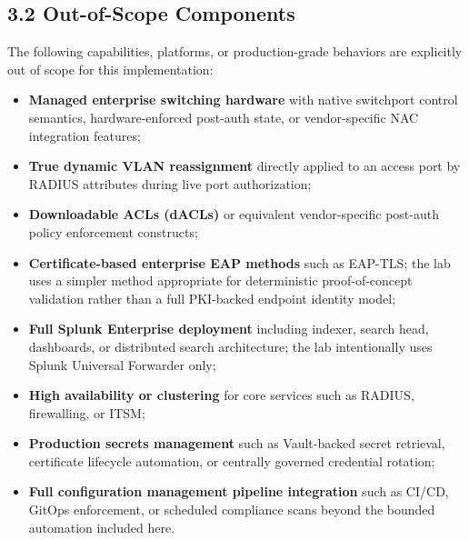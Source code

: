 \documentclass[11pt]{article}
\begin{document}

\subsection{3.2 Out-of-Scope Components}
\label{sec:out-of-scope-components}

The following capabilities, platforms, or production-grade behaviors are explicitly out of scope for this implementation:

\begin{itemize}
    \item \textbf{Managed enterprise switching hardware} with native switchport control semantics, hardware-enforced post-auth state, or vendor-specific NAC integration features;
    \item \textbf{True dynamic VLAN reassignment} directly applied to an access port by RADIUS attributes during live port authorization;
    \item \textbf{Downloadable ACLs (dACLs)} or equivalent vendor-specific post-auth policy enforcement constructs;
    \item \textbf{Certificate-based enterprise EAP methods} such as EAP-TLS; the lab uses a simpler method appropriate for deterministic proof-of-concept validation rather than a full PKI-backed endpoint identity model;
    \item \textbf{Full Splunk Enterprise deployment} including indexer, search head, dashboards, or distributed search architecture; the lab intentionally uses Splunk Universal Forwarder only;
    \item \textbf{High availability or clustering} for core services such as RADIUS, firewalling, or ITSM;
    \item \textbf{Production secrets management} such as Vault-backed secret retrieval, certificate lifecycle automation, or centrally governed credential rotation;
    \item \textbf{Full configuration management pipeline integration} such as CI/CD, GitOps enforcement, or scheduled compliance scans beyond the bounded automation included here.
\end{itemize}
\end{document}
